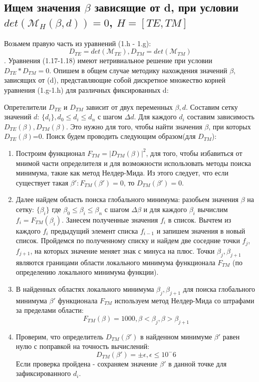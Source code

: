 \documentclass{article}
\begin{document}
\subsection{Ищем значения $\beta$ зависящие от d, при условии $det(\mathcal{M}_{H}(\beta, d)) = 0$, $H = \left [TE, TM \right]$ }

Возьмем правую часть из уравнений (1.h - 1.g): $$D_{TE} = det(\mathcal{M}_{TE}), D_{TM} = det(\mathcal{M}_{TM})$$.
Уравнения (1.17-1.18) имеют нетривиальное решение при условии $D_{TE} * D_{TM} = 0$. Опишем в общем случае методику нахождения значений $\beta$, зависящих от (d), представляющие собой дискретное множество корней уравнения (1.g-1.h) для различных фиксированных d:
\par Опретелители $D_{TE}$ и $D_{TM}$ зависит от двух переменных $\beta, d$. Составим сетку значений $d$: $\{ d_i \}, d_0 \leq d_i \leq d_n$ с шагом $\Delta d$. Для каждого $d_i$ составим зависимость $D_{TE}(\beta), D_{TM}(\beta)$. Это нужно для того, чтобы найти значения $\beta$, при которых $D_{TE}(\beta)$=0. Поиск будем проводить следующим образом(для $D_{TM}$): \begin{enumerate}
    \item Построим функционал $F_{TM} = |D_{TM}(\beta)|^2$, для того, чтобы избавиться от мнимой части определителя и для возможности использовать методы поиска минимума, такие как метод Нелдер-Мида. Из этого следует, что если существует такая $\beta': F_{TM}(\beta') = 0 $, то $ D_{TM}(\beta') = 0$.
    \item Далее найдем область поиска глобального минимума: разобьем значения $\beta$ на сетку: $\{\beta_i\}$ где $\beta_0 \leq \beta_i \leq \beta_n$ с шагом $\Delta \beta$ и для каждого $\beta_i$ вычислим $f_i = F_{TM}(\beta_i)$. Занесем полученные значения $f_i$ в список. Вычтем из каждого $f_i$ предыдущий элемент списка $f_{i-1}$ и запишем значения в новый список. Пройдемся по полученному списку и найдем две соседние точки $f_{j}$, $f_{j+1}$, на которых значение меняет знак с минуса на плюс. Точки $\beta_j, \beta_{j+1}$ являются границами области локального минимума функционала $F_{TM}$ (по определению локального минимума функции).   
    \item В найденных областях локального минимума $\beta_j, \beta_{j+1}$ для поиска глобального минимума $\beta'$ функционала $F_{TM}$ используем метод Нелдер-Мида со штрафами за пределами области: 
    $$
    F_{TM}(\beta) = 1000, \beta < \beta_j, \beta > \beta_{j+1}
    $$
    \item Проверим, что определитель $D_{TM}(\beta')$ в найденном минимуме $\beta'$ равен нулю с поправкой на точность вычислений: $$
    D_{TM}(\beta') = \pm \epsilon, \epsilon \leq 10^-6
    $$ Если проверка пройдена - сохраняем значение $\beta'$ в данной точке для зафиксированного $d_i$. 
\end{enumerate}
\end{document}
